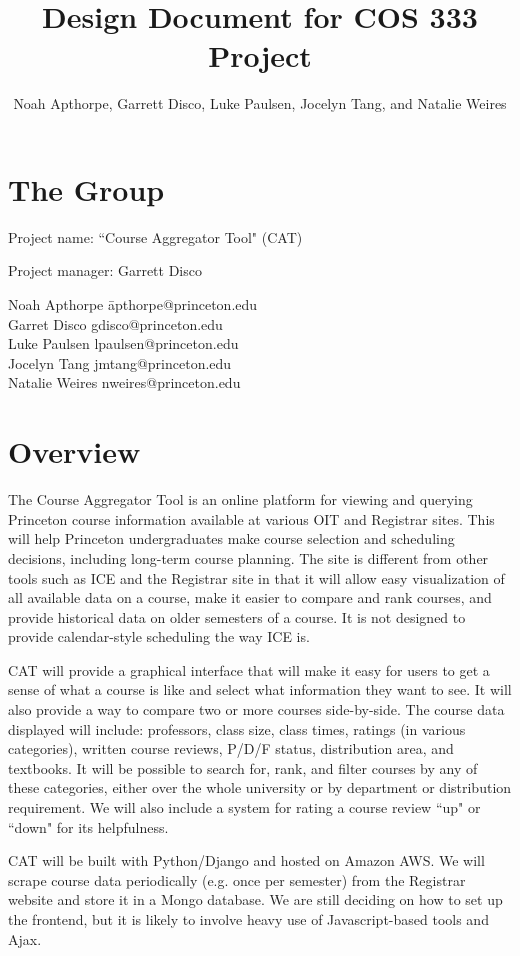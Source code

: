 \documentclass[11pt]{article}
\title{ Design Document for COS 333 Project }
\author{Noah Apthorpe, Garrett Disco, Luke Paulsen, Jocelyn Tang, and Natalie Weires}
\begin{document}
\maketitle

\section{The Group}
\par Project name: ``Course Aggregator Tool" (CAT)
\par Project manager: Garrett Disco
\begin{tabbing}
Noah Apthorpe\; \= apthorpe@princeton.edu \\
Garret Disco \> gdisco@princeton.edu \\
Luke Paulsen \> lpaulsen@princeton.edu \\
Jocelyn Tang \> jmtang@princeton.edu \\
Natalie Weires \> nweires@princeton.edu
\end{tabbing}

\section{Overview}
\par The Course Aggregator Tool is an online platform for viewing and querying Princeton course information available at various OIT and Registrar sites. This will help Princeton undergraduates make course selection and scheduling decisions, including long-term course planning. The site is different from other tools such as ICE and the Registrar site in that it will allow easy visualization of all available data on a course, make it easier to compare and rank courses, and provide historical data on older semesters of a course. It is not designed to provide calendar-style scheduling the way ICE is.
\par CAT will provide a graphical interface that will make it easy for users to get a sense of what a course is like and select what information they want to see. It will also provide a way to compare two or more courses side-by-side. The course data displayed will include: professors, class size, class times, ratings (in various categories), written course reviews, P/D/F status, distribution area, and textbooks. It will be possible to search for, rank, and filter courses by any of these categories, either over the whole university or by department or distribution requirement. We will also include a system for rating a course review ``up" or ``down" for its helpfulness.
\par CAT will be built with Python/Django and hosted on Amazon AWS. We will scrape course data periodically (e.g. once per semester) from the Registrar website and store it in a Mongo database. We are still deciding on how to set up the frontend, but it is likely to involve heavy use of Javascript-based tools and Ajax.
\end{document}
